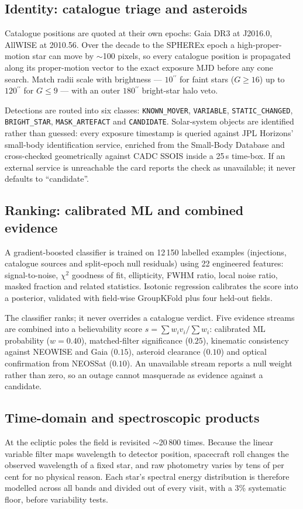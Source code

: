 \documentclass[11pt,a4paper]{article}
\newcommand{\code}[1]{\texttt{\small #1}}
\newcommand{\arcsec}{\ensuremath{{}^{\prime\prime}}}
\begin{document}
{\subsection{Identity: catalogue triage and asteroids}
Catalogue positions are quoted at their own epochs: Gaia DR3 at J2016.0, AllWISE at 2010.56. Over
the decade to the SPHEREx epoch a high-proper-motion star can move by $\sim$100 pixels, so every
catalogue position is propagated along its proper-motion vector to the exact exposure MJD before any
cone search. Match radii scale with brightness --- $10\arcsec$ for faint stars ($G\ge16$) up to
$120\arcsec$ for $G\le9$ --- with an outer $180\arcsec$ bright-star halo veto.

Detections are routed into six classes: \code{KNOWN\_MOVER}, \code{VARIABLE}, \code{STATIC\_CHANGED},
\code{BRIGHT\_STAR}, \code{MASK\_ARTEFACT} and \code{CANDIDATE}. Solar-system objects are identified
rather than guessed: every exposure timestamp is queried against JPL Horizons' small-body
identification service, enriched from the Small-Body Database and cross-checked geometrically
against CADC SSOIS inside a 25\,s time-box. If an external service is unreachable the card reports
the check as unavailable; it never defaults to ``candidate''.

\subsection{Ranking: calibrated ML and combined evidence}
A gradient-boosted classifier is trained on 12\,150 labelled examples (injections, catalogue sources
and split-epoch null residuals) using 22 engineered features: signal-to-noise, $\chi^2$ goodness of
fit, ellipticity, FWHM ratio, local noise ratio, masked fraction and related statistics. Isotonic
regression calibrates the score into a posterior, validated with field-wise GroupKFold plus four
held-out fields.

The classifier ranks; it never overrides a catalogue verdict. Five evidence streams are combined into
a believability score $s=\sum w_i v_i/\sum w_i$: calibrated ML probability ($w=0.40$), matched-filter
significance ($0.25$), kinematic consistency against NEOWISE and Gaia ($0.15$), asteroid clearance
($0.10$) and optical confirmation from NEOSSat ($0.10$). An unavailable stream reports a null weight
rather than zero, so an outage cannot masquerade as evidence against a candidate.

\subsection{Time-domain and spectroscopic products}
At the ecliptic poles the field is revisited $\sim$20\,800 times. Because the linear variable filter
maps wavelength to detector position, spacecraft roll changes the observed wavelength of a fixed
star, and raw photometry varies by tens of per cent for no physical reason. Each star's spectral
energy distribution is therefore modelled across all bands and divided out of every visit, with a 3\%
systematic floor, before variability tests.

}
\end{document}
